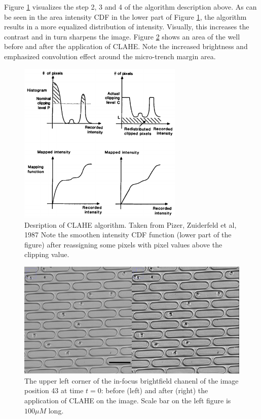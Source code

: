 \documentclass[pdftex,12pt,a4paper]{report}
\begin{document}
Figure \ref{fig:clahe} visualizes the step 2, 3 and 4 of the algorithm description above. As can be seen in the area intensity CDF in the lower part of Figure \ref{fig:clahe}, the algorithm results in a more equalized distribution of intensity. Visually, this increases the contrast and in turn sharpens the image. Figure \ref{fig:clahe_before_after} shows an area of the well before and after the application of CLAHE. Note the increased brightness and emphasized convolution effect around the micro-trench margin area.

\begin{figure}[H]
\centering
\includegraphics[width=0.7\textwidth]{images/clahe}
\caption[Visualizatoin of CLAHE algorithm]{Desription of CLAHE algorithm. Taken from Pizer, Zuiderfeld et al, 1987 \cite{pizer1987adaptive}  Note the  smoothen intensity CDF function (lower part of the figure) after reassigning some pixels with pixel values above the clipping value.}
\label{fig:clahe}
\end{figure}

\begin{figure}[H]
\centering
\includegraphics[width=\textwidth]{images/clahe_before_after}
\caption[Example of application of CLAHE algorithm]{The upper left corner of the in-focus brightfield chanenl of the image position 43 at time $t=0$: before (left) and after (right) the application of CLAHE on the image. Scale bar on the left figure is $100 \mu M$ long.}
\label{fig:clahe_before_after}
\end{figure}
\end{document}
